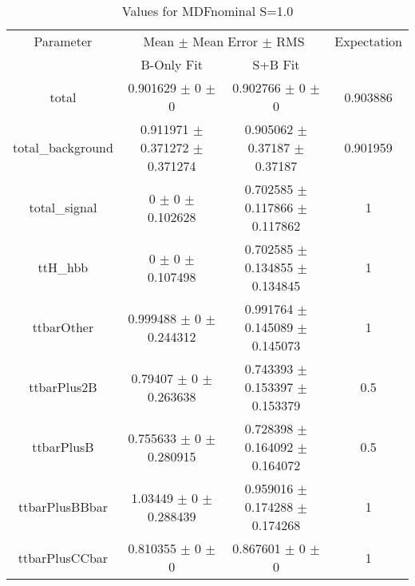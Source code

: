 \begin{table}
\centering
\caption{Values for MDFnominal S=1.0}
\begin{tabular}{cccc}
\toprule
Parameter & \multicolumn{2}{c}{Mean $\pm$ Mean Error $\pm$ RMS} & Expectation\\
 & B-Only Fit & S+B Fit & \\
\midrule
total & \num{0.901629} $\pm$ \num{0} $\pm$ \num{0} & \num{0.902766} $\pm$ \num{0} $\pm$ \num{0} & \num{0.903886}\\
total\_background & \num{0.911971} $\pm$ \num{0.371272} $\pm$ \num{0.371274} & \num{0.905062} $\pm$ \num{0.37187} $\pm$ \num{0.37187} & \num{0.901959}\\
total\_signal & \num{0} $\pm$ \num{0} $\pm$ \num{0.102628} & \num{0.702585} $\pm$ \num{0.117866} $\pm$ \num{0.117862} & \num{1}\\
ttH\_hbb & \num{0} $\pm$ \num{0} $\pm$ \num{0.107498} & \num{0.702585} $\pm$ \num{0.134855} $\pm$ \num{0.134845} & \num{1}\\
ttbarOther & \num{0.999488} $\pm$ \num{0} $\pm$ \num{0.244312} & \num{0.991764} $\pm$ \num{0.145089} $\pm$ \num{0.145073} & \num{1}\\
ttbarPlus2B & \num{0.79407} $\pm$ \num{0} $\pm$ \num{0.263638} & \num{0.743393} $\pm$ \num{0.153397} $\pm$ \num{0.153379} & \num{0.5}\\
ttbarPlusB & \num{0.755633} $\pm$ \num{0} $\pm$ \num{0.280915} & \num{0.728398} $\pm$ \num{0.164092} $\pm$ \num{0.164072} & \num{0.5}\\
ttbarPlusBBbar & \num{1.03449} $\pm$ \num{0} $\pm$ \num{0.288439} & \num{0.959016} $\pm$ \num{0.174288} $\pm$ \num{0.174268} & \num{1}\\
ttbarPlusCCbar & \num{0.810355} $\pm$ \num{0} $\pm$ \num{0} & \num{0.867601} $\pm$ \num{0} $\pm$ \num{0} & \num{1}\\
\bottomrule
\end{tabular}
\end{table}